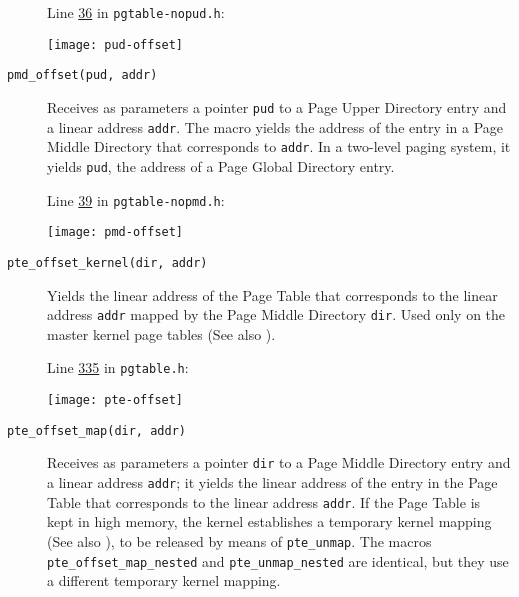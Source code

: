 \begin{description}
  Line \href{http://lxr.linux.no/linux+v2.6.11/include/asm-generic/pgtable-nopud.h\#L36}{36} in
  \texttt{pgtable-nopud.h}:
  \begin{center}
    \texttt{[image: pud-offset]}
  \end{center}

\item[\texttt{pmd\_offset(pud, addr)}] Receives as parameters a pointer \texttt{pud} to a Page
  Upper Directory entry and a linear address \texttt{addr}. The macro yields the address of the
  entry in a Page Middle Directory that corresponds to \texttt{addr}. In a two-level paging system,
  it yields \texttt{pud}, the address of a Page Global Directory entry.

  Line \href{http://lxr.linux.no/linux+v2.6.11/include/asm-generic/pgtable-nopmd.h\#L39}{39} in
  \texttt{pgtable-nopmd.h}:
  \begin{center}    
    \texttt{[image: pmd-offset]}
  \end{center}


\item[\texttt{pte\_offset\_kernel(dir, addr)}] Yields the linear address of the Page Table
  that corresponds to the linear address \texttt{addr} mapped by the Page Middle Directory
  \texttt{dir}. Used only on the master kernel page tables (See also ).

  Line \href{http://lxr.linux.no/linux+v2.6.11/include/asm-i386/pgtable.h\#L335}{335} in
  \texttt{pgtable.h}:
  \begin{center}
    \texttt{[image: pte-offset]}
  \end{center}

\item[\texttt{pte\_offset\_map(dir, addr)}] Receives as parameters a pointer \texttt{dir} to a
  Page Middle Directory entry and a linear address \texttt{addr}; it yields the linear
  address of the entry in the Page Table that corresponds to the linear address
  \texttt{addr}. If the Page Table is kept in high memory, the kernel establishes a
  temporary kernel mapping (See also ), to be released by means of
  \texttt{pte\_unmap}. The macros \texttt{pte\_offset\_map\_nested} and
  \texttt{pte\_unmap\_nested} are identical, but they use a different temporary kernel
  mapping.


\end{description}
